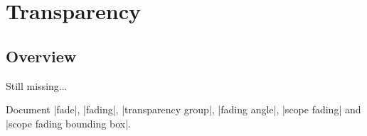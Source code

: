 %
%
%


\section{Transparency}

\label{section-tikz-transparency}


\subsection{Overview}

Still missing...

Document |fade|, |fading|, |transparency group|, |fading angle|,
|scope fading| and |scope fading bounding box|.








